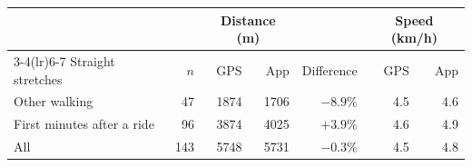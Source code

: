 \begin{tabular}{@{}lrrrrrr@{}}
\toprule
 & & \multicolumn{2}{c}{Distance (m)} & & \multicolumn{2}{c}{Speed (km/h)}\\
\cmidrule(lr){3-4}\cmidrule(lr){6-7}
Straight stretches & $n$ & GPS & App & Difference & GPS & App\\
\midrule
Other walking & 47 & 1874 & 1706 & $-8.9\%$ & 4.5 & 4.6 \\
First minutes after a ride & 96 & 3874 & 4025 & $+3.9\%$ & 4.6 & 4.9 \\
\midrule
All & 143 & 5748 & 5731 & $-0.3\%$ & 4.5 & 4.8 \\
\bottomrule
\end{tabular}
